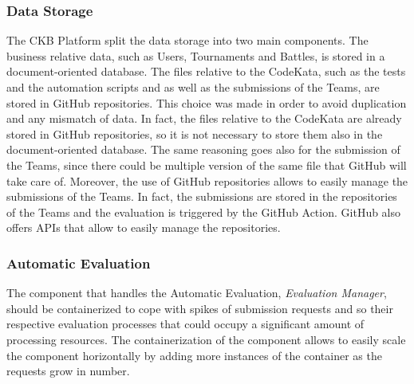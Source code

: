 \subsubsection{Data Storage}
The CKB Platform split the data storage into two main components. The business relative data, such as Users, Tournaments and Battles, is stored in a document-oriented database. The files relative to the CodeKata, such as the tests and the automation scripts and as well as the submissions of the Teams, are stored in GitHub repositories. This choice was made in order to avoid duplication and any mismatch of data. In fact, the files relative to the CodeKata are already stored in GitHub repositories, so it is not necessary to store them also in the document-oriented database. The same reasoning goes also for the submission of the Teams, since there could be multiple version of the same file that GitHub will take care of. Moreover, the use of GitHub repositories allows to easily manage the submissions of the Teams. In fact, the submissions are stored in the repositories of the Teams and the evaluation is triggered by the GitHub Action. GitHub also offers APIs that allow to easily manage the repositories.

\subsubsection{Automatic Evaluation}
The component that handles the Automatic Evaluation, \textit{Evaluation Manager}, should be containerized to cope with spikes of submission requests and so their respective evaluation processes that could occupy a significant amount of processing resources. The containerization of the component allows to easily scale the component horizontally by adding more instances of the container as the requests grow in number.